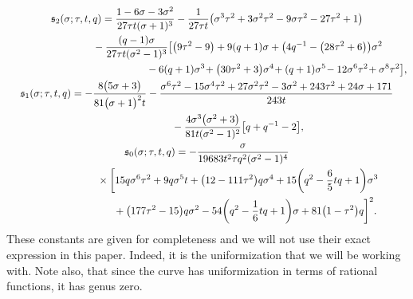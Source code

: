 \documentclass[pdftex]{sigma}
\numberwithin{equation}{section}
\begin{document}
 \begin{gather*}
 \mathfrak{s}_2(\sigma;\tau,t,q)= \frac{1-6\sigma-3\sigma^2}{27\tau t (\sigma+1)^3} - \frac{1}{27\tau t}\bigl(\sigma^{3} \tau^{2}+3 \sigma^{2} \tau^{2}-9 \sigma \tau^{2}-27 \tau^{2}+1\bigr) \nonumber\\
 \hphantom{\mathfrak{s}_2(\sigma;\tau,t,q)=}{}
 -\frac{(q-1)\sigma}{27\tau t(\sigma^2 - 1)^3}\bigl[\bigl(9 \tau^{2}-9\bigr)+9(q+1) \sigma +\bigl(4q^{-1}-\bigl(28 \tau^{2}+6\bigr) \bigr) \sigma^{2} \\
 \hphantom{\mathfrak{s}_2(\sigma;\tau,t,q)=-\frac{(q-1)\sigma}{27\tau t(\sigma^2 - 1)^3}\bigl[}{}
 -6 (q+1 ) \sigma^{3}\!+\bigl(30 \tau^{2}+3\bigr)\sigma^{4}\!+(q+1) \sigma^{5}\!-12\sigma^{6} \tau^{2}\!+\sigma^{8} \tau^{2}\bigr]\nonumber,\\
 \mathfrak{s}_1(\sigma;\tau,t,q) = -\frac{8 \bigl(5 \sigma +3\bigr)}{81 \bigl(\sigma +1\bigr)^{2} t} -\frac{\sigma^{6} \tau^{2}-15 \sigma^{4} \tau^{2}+27 \sigma^{2} \tau^{2}-3 \sigma^{2}+243 \tau^{2}+24 \sigma +171}{243 t}\nonumber\\
 \hphantom{\mathfrak{s}_1(\sigma;\tau,t,q) =}{}
 -\frac{4\sigma^3\bigl(\sigma^2+3\bigr)}{81t(\sigma^2 - 1)^2}\bigl[q+q^{-1}-2\bigr],\\
 \mathfrak{s}_0(\sigma;\tau,t,q) = -\frac{\sigma}{19683t^2\tau q^2(\sigma^2 - 1)^4} \nonumber \\
 \hphantom{\mathfrak{s}_0(\sigma;\tau,t,q) =}{}
 \times\biggl[15 q \sigma^{6} \tau^{2}+9 q \sigma^{5} t +\bigl(12-111 \tau^{2}\bigr) q\sigma^{4} +15\biggl(q^{2}-\frac{6}{5}t q +1\biggr) \sigma^{3}\nonumber\\
 \hphantom{\mathfrak{s}_0(\sigma;\tau,t,q) =\times\bigl[}{}
 +\bigl(177 \tau^{2}-15\bigr) q \sigma^{2}-54\biggl(q^{2}-\frac{1}{6}t q +1\biggr) \sigma
 + 81\bigl(1-\tau^{2}\bigr) q\biggr]^2.
 \end{gather*}
 These constants are given for completeness and we will not use their exact expression in this paper. Indeed, it is the uniformization that we will be working with. Note also, that since the curve has uniformization in terms of rational functions, it has genus zero.
\end{document}
